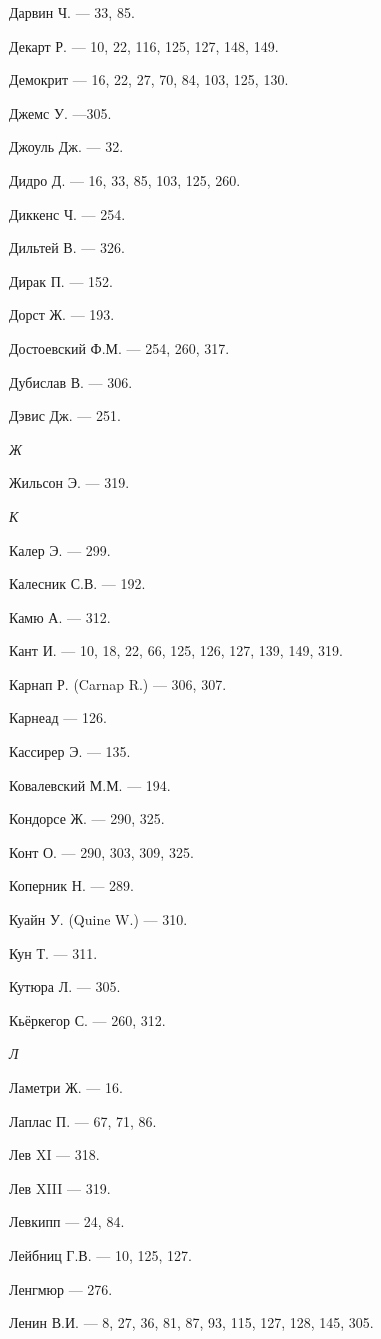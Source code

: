 \documentclass[a4paper,14pt,russian]{extreport}
\begin{document}
Дарвин Ч. --- 33, 85.

Декарт Р. --- 10, 22, 116, 125, 127, 148, 149.

Демокрит --- 16, 22, 27, 70, 84, 103, 125, 130.

Джемс У. ---305.

Джоуль Дж. --- 32.

Дидро Д. --- 16, 33, 85, 103, 125, 260.

Диккенс Ч. --- 254.

Дильтей В. --- 326.

Дирак П. --- 152.

Дорст Ж. --- 193.

Достоевский Ф.М. --- 254, 260, 317.

Дубислав В. --- 306.

Дэвис Дж. --- 251.

\emph{Ж}

Жильсон Э. --- 319.

\emph{К}

Калер Э. --- 299.

Калесник С.В. --- 192.

Камю А. --- 312.

Кант И. --- 10, 18, 22, 66, 125, 126, 127, 139, 149, 319.

Карнап Р. (Carnap R.) --- 306, 307.

Карнеад --- 126.

Кассирер Э. --- 135.

Ковалевский М.М. --- 194.

Кондорсе Ж. --- 290, 325.

Конт О. --- 290, 303, 309, 325.

Коперник Н. --- 289.

Куайн У. (Quine W.) --- 310.

Кун Т. --- 311.

Кутюра Л. --- 305.

Кьёркегор С. --- 260, 312.

\emph{Л}

Ламетри Ж. --- 16.

Лаплас П. --- 67, 71, 86.

Лев XI --- 318.

Лев XIII --- 319.

Левкипп --- 24, 84.

Лейбниц Г.В. --- 10, 125, 127.

Ленгмюр --- 276.

Ленин В.И. --- 8, 27, 36, 81, 87, 93, 115, 127, 128, 145, 305.
\end{document}
